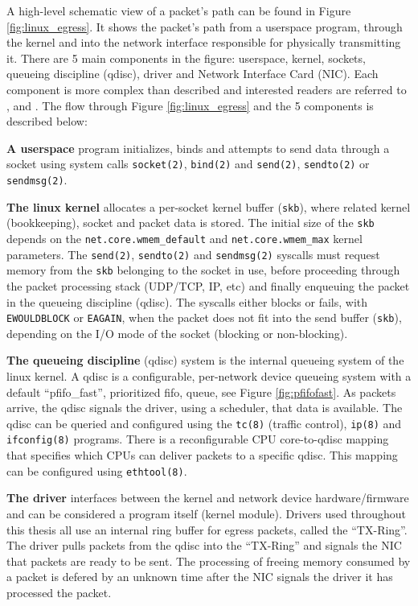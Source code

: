 A high-level schematic view of a packet's path can be found in Figure \ref{fig:linux_egress}. It shows the packet's path from a userspace program,
through the kernel and into the network interface responsible for physically
transmitting it.  There are 5
main components in the figure: userspace, kernel, sockets, queueing
discipline (qdisc), driver and Network Interface Card (NIC). Each component is
more complex than described and interested readers are referred to
\cite{knet}, \cite{pcsending} and \cite[Chapter~17]{ldd}. The flow through
Figure \ref{fig:linux_egress} and the 5 components is described below:

\textbf{A userspace} program initializes, binds and attempts to send
data through a socket using system calls \texttt{socket(2)}, \texttt{bind(2)}
and \texttt{send(2)}, \texttt{sendto(2)} or \texttt{sendmsg(2)}.

\textbf{The linux kernel} allocates a per-socket kernel buffer
(\texttt{skb}),  where related kernel (bookkeeping), socket and packet data is
stored. The initial size of the \texttt{skb} depends on the
\texttt{net.core.wmem\_default} and  \texttt{net.core.wmem\_max} kernel
parameters. The \texttt{send(2)}, \texttt{sendto(2)} and  \texttt{sendmsg(2)}
syscalls must request memory from the \texttt{skb} belonging to the  socket
in use, before proceeding through the packet processing stack (UDP/TCP, IP,
etc)  and finally enqueuing the packet in the queueing discipline (qdisc). The
syscalls either blocks or fails, with \texttt{EWOULDBLOCK} or \texttt{EAGAIN},
when the  packet does not fit into the send buffer (\texttt{skb}), depending
on the I/O  mode of the socket (blocking or non-blocking).

\textbf{The queueing discipline} (qdisc) system is the internal
queueing system  of the linux kernel. A qdisc is a configurable, per-network
device queueing system with a  default ``pfifo\_fast'', prioritized fifo,
queue, see Figure \ref{fig:pfifofast}. As  packets arrive, the qdisc signals
the driver, using a scheduler, that data is available.  The qdisc can be
queried and configured using the \texttt{tc(8)} (traffic control),
\texttt{ip(8)} and \texttt{ifconfig(8)} programs. There is a reconfigurable
CPU core-to-qdisc mapping that specifies which CPUs can deliver packets to
a specific qdisc. This mapping can be configured using \texttt{ethtool(8)}.

\textbf{The driver} interfaces between the kernel and network device
hardware/firmware and can be considered a program itself (kernel module).
Drivers used throughout this thesis all use an internal ring buffer for egress
packets, called the ``TX-Ring''. The driver pulls packets from the qdisc into
the ``TX-Ring'' and signals the NIC that packets are ready to be sent. The
processing of freeing memory consumed by a packet is defered by an unknown
time after the NIC signals the driver it has processed the packet.

